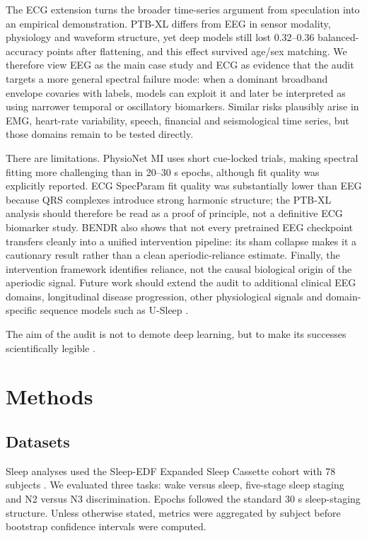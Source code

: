 \documentclass[pdflatex,sn-nature]{sn-jnl}
\begin{document}
The ECG extension turns the broader time-series argument from speculation into an empirical demonstration. PTB-XL differs from EEG in sensor modality, physiology and waveform structure, yet deep models still lost 0.32--0.36 balanced-accuracy points after flattening, and this effect survived age/sex matching. We therefore view EEG as the main case study and ECG as evidence that the audit targets a more general spectral failure mode: when a dominant broadband envelope covaries with labels, models can exploit it and later be interpreted as using narrower temporal or oscillatory biomarkers. Similar risks plausibly arise in EMG, heart-rate variability, speech, financial and seismological time series, but those domains remain to be tested directly.

There are limitations. PhysioNet MI uses short cue-locked trials, making spectral fitting more challenging than in 20--30 s epochs, although fit quality was explicitly reported. ECG SpecParam fit quality was substantially lower than EEG because QRS complexes introduce strong harmonic structure; the PTB-XL analysis should therefore be read as a proof of principle, not a definitive ECG biomarker study. BENDR also shows that not every pretrained EEG checkpoint transfers cleanly into a unified intervention pipeline: its sham collapse makes it a cautionary result rather than a clean aperiodic-reliance estimate. Finally, the intervention framework identifies reliance, not the causal biological origin of the aperiodic signal. Future work should extend the audit to additional clinical EEG domains, longitudinal disease progression, other physiological signals and domain-specific sequence models such as U-Sleep \cite{perslev2021usleep}.

The aim of the audit is not to demote deep learning, but to make its successes scientifically legible \cite{brookshire2024leakage}.

\section{Methods}

\subsection{Datasets}

Sleep analyses used the Sleep-EDF Expanded Sleep Cassette cohort with 78 subjects \cite{kemp2000sleep,kemp2013sleepedf,goldberger2000physionet}. We evaluated three tasks: wake versus sleep, five-stage sleep staging and N2 versus N3 discrimination. Epochs followed the standard 30 s sleep-staging structure. Unless otherwise stated, metrics were aggregated by subject before bootstrap confidence intervals were computed.
\end{document}
